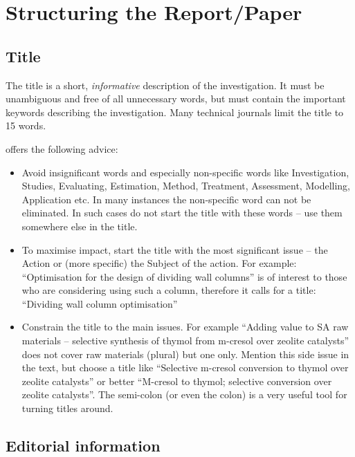 \documentclass[a5paper, 10pt]{article}
\begin{document}
\section{Structuring the Report/Paper}
\label{cha:structure}

\subsection{Title}
\label{sec:title}
The title is a short, \emph{informative} description of the
investigation.  It must be unambiguous and free of all unnecessary
words, but must contain the important keywords describing the
investigation. Many technical journals limit the title to 15 words.

\citet{mandersloot} offers the following advice:
\begin{itemize}
\item Avoid insignificant words and especially non-specific words like
  Investigation, Studies, Evaluating, Estimation, Method, Treatment,
  Assessment, Modelling, Application etc. In many instances the
  non-specific word can not be eliminated. In such cases do not start
  the title with these words -- use them somewhere else in the title.

\item To maximise impact, start the title with the most significant
  issue -- the Action or (more specific) the Subject of the action.
  For example: ``Optimisation for the design of dividing wall columns''
  is of interest to those who are considering using such a column,
  therefore it calls for a title: ``Dividing wall column optimisation''

\item Constrain the title to the main issues. For example ``Adding
  value to SA raw materials -- selective synthesis of thymol from
  m-cresol over zeolite catalysts'' does not cover raw materials
  (plural) but one only. Mention this side issue in the text, but
  choose a title like ``Selective m-cresol conversion to thymol over
  zeolite catalysts'' or better ``M-cresol to thymol; selective
  conversion over zeolite catalysts''.  The semi-colon (or even the
  colon) is a very useful tool for turning titles around.
\end{itemize}

\subsection{Editorial information}
\end{document}
